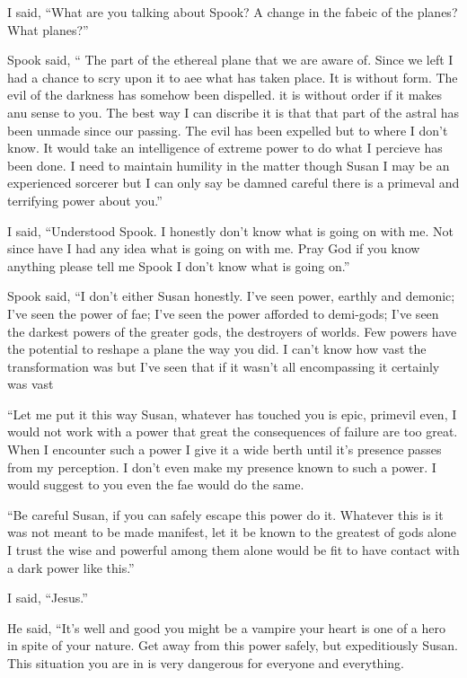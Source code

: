 I said, ``What are you talking about Spook? A change in the fabeic of the planes? What planes?''

Spook said, `` The part of the ethereal plane that we are aware of. Since we left I had a chance to scry upon it to aee what has taken place. It is without form. The evil of the darkness has somehow been dispelled. it is without order if it makes anu sense to you. The best way I can discribe it is that that part of the astral has been unmade since our passing. The evil has been expelled but to where I don't know. It would take an intelligence of extreme power to do what I percieve has been done. I need to maintain humility in the matter though Susan I may be an experienced sorcerer but I can only say be damned careful there is a primeval and terrifying power about you.''

I said, ``Understood Spook. I honestly don't know what is going on with me. Not since \chichenitza{} have I had any idea what is going on with me. Pray God if you know anything please tell me Spook I don't know what is going on.''

Spook said, ``I don't either Susan honestly. I've seen power, earthly and demonic; I've seen the power of fae; I've seen the power afforded to demi-gods; I've seen the darkest powers of the greater gods, the destroyers of worlds. Few powers have the potential to reshape a plane the way you did. I can't know how vast the transformation was but I've seen that if it wasn't all encompassing it certainly was vast

``Let me put it this way Susan, whatever has touched you is epic, primevil even, I would not work with a power that great the consequences of failure are too great. When I encounter such a power I give it a wide berth until it's presence passes from my perception. I don't even make my presence known to such a power. I would suggest to you even the fae would do the same.

``Be careful Susan, if you can safely escape this power do it. Whatever this is it was not meant to be made manifest, let it be known to the greatest of gods alone I trust the wise and powerful among them alone would be fit to have contact with a dark power like this.''

I said, ``Jesus.''

He said, ``It's well and good you might be a vampire your heart is one of a hero in spite of your nature. Get away from this power safely, but expeditiously Susan. This situation you are in is very dangerous for everyone and everything.


